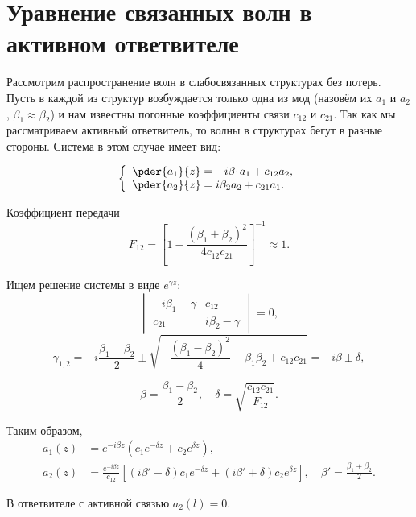 \documentclass{hedwork}
\begin{document}
\section{Уравнение связанных волн в активном ответвителе}
Рассмотрим распространение волн в слабосвязанных структурах без потерь. Пусть в
каждой из структур возбуждается только одна из мод
(назовём их \(a_1\) и \(a_2\), \( \beta_1 \approx \beta_2 \)) и нам известны
погонные коэффициенты связи \( c_{12} \) и \( c_{21} \). Так как мы
рассматриваем активный ответвитель, то волны в структурах бегут в разные
стороны. Система в этом случае имеет вид:

\begin{equation}
    \left\{
    \begin{array}{l}
        \pder{a_1}{z} = -i\beta_1 a_1 + c_{12}a_2,\\
        \pder{a_2}{z} = i\beta_2 a_2 + c_{21}a_1.
    \end{array}
    \right.
\end{equation}

Коэффициент передачи
\begin{equation}
    F_{12} = \left[1 - \frac{(\beta_1 + \beta_2)^2}{4c_{12}c_{21}}\right]^{-1}
    \approx 1.
\end{equation}

Ищем решение системы в виде \( e^{\gamma z} \):
\begin{equation}
    \begin{vmatrix}
        -i\beta_1-\gamma & c_{12} \\
        c_{21} & i\beta_2-\gamma
    \end{vmatrix}
    = 0,
\end{equation}
\begin{equation}
    \gamma_{1,2} = -i\frac{\beta_1-\beta_2}{2} \pm \sqrt{-\frac{(\beta_1 -
    \beta_2)^2}{4} - \beta_1\beta_2 + c_{12}c_{21}}=
    -i\beta \pm \delta,
\end{equation}

\[
    \beta = \frac{\beta_1 - \beta_2}{2},\quad
    \delta = \sqrt{\frac{c_{12}c_{21}}{F_{12}}}.
\]

Таким образом,
\begin{align}
    a_1(z) & = e^{-i\beta z}\left(c_1 e^{-\delta z} + c_2e^{\delta z}\right),\\
    a_2(z) & = \frac{e^{-i\beta z}}{c_{12}}
    \left[(i\beta' - \delta)c_1e^{-\delta z}+
    (i\beta'+\delta)c_2e^{\delta z}\right],\quad
    \beta' = \frac{\beta_1+\beta_2}{2}.
\end{align}

В ответвителе с активной связью \( a_2(l) = 0 \).
\end{document}
